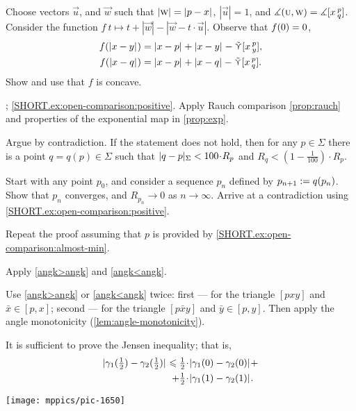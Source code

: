 \begin{multicols}{2}
Choose vectors $\vec u$, and $\vec w$ 
such that $|\vec w|\z=\dist{p}{x}{}$, $|\vec u|=1$, and $\measuredangle(\text{\sc{u}},\text{\sc{w}})=\measuredangle[x\,{}^{p}_{q}]$.
Consider the function
$f\:t\mapsto t+|\vec w|-|\vec w-t\cdot \vec u|$.
Observe that $f(0)\z=0$,
\begin{align*}
f(\dist{x}{y}{})&=\dist{x}{p}{}+\dist{x}{y}{}-\side\hinge xpy,
\\
f(\dist{x}{q}{})&=\dist{x}{p}{}+\dist{x}{q}{}-\side\hinge xpq.
\end{align*}
Show and use that $f$ is concave.

\parbf{\ref{ex:open-comparison}}; \ref{SHORT.ex:open-comparison:positive}.
Apply Rauch comparison \ref{prop:rauch} and properties of the exponential map in \ref{prop:exp}.

 Argue by contradiction.
If the statement does not hold, then for any $p\in\Sigma$ there is a point $q=q(p)\in \Sigma$ such that 
$\dist{q}{p}\Sigma< 100\cdot R_p$
and
$R_q<(1-\tfrac1{100})\cdot R_p$.

Start with any point $p_0$, and consider a sequence $p_n$ defined by $p_{n+1}\z\df q(p_n)$.
Show that $p_n$ converges, and $R_{p_n}\to 0$ as $n\to\infty$.
Arrive at a contradiction using \ref{SHORT.ex:open-comparison:positive}.

 Repeat the proof assuming that $p$ is provided by \ref{SHORT.ex:open-comparison:almost-min}.

Apply \ref{angk>angk} and \ref{angk<angk}.

 Use \ref{angk>angk} or \ref{angk<angk} twice:
first --- for the triangle $[pxy]$ and $\bar x\in [p,x]$;
second --- for the triangle $[p\bar xy]$ and $\bar y\in [p,y]$.
Then apply the angle monotonicity (\ref{lem:angle-monotonicity}).

It is sufficient to prove the Jensen inequality;
that is, 
\begin{align*}
\dist{\gamma_1(\tfrac12)}{\gamma_2(\tfrac12)}{}
\le
\tfrac12\cdot&\dist{\gamma_1(0)}{\gamma_2(0)}{}
+
\\
+
\tfrac12\cdot&\dist{\gamma_1(1)}{\gamma_2(1)}{}.
\end{align*}

\begin{Figure}
\vskip-0mm
\centering
\texttt{[image: mppics/pic-1650]}
\vskip1mm
\end{Figure}


\end{multicols}
